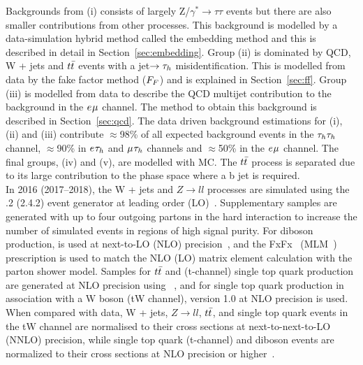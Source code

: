 Backgrounds from (i) consists of largely Z/$\gamma^* \rightarrow \tau\tau$ events but there are also smaller contributions from other processes. 
This background is modelled by a data-simulation hybrid method called the embedding method and this is described in detail in Section~\ref{sec:embedding}.
Group (ii) is dominated by QCD, W + jets and $t\bar{t}$ events with a jet$\rightarrow \tau_{h}$ misidentification.
This is modelled from data by the fake factor method ($F_{F}$) and is explained in Section~\ref{sec:ff}.
Group (iii) is modelled from data to describe the QCD multijet contribution to the background in the $e_{}\mu_{}$ channel.
The method to obtain this background is described in Section~\ref{sec:qcd}.
The data driven background estimations for (i), (ii) and (iii) contribute $\approx$98\% of all expected background events in the $\tau_{h}\tau_{h}$ channel, $\approx$90\% in $e_{}\tau_{h}$ and $\mu_{}\tau_{h}$ channels and $\approx$50\% in the $e_{}\mu_{}$ channel.
The final groups, (iv) and (v), are modelled with MC.
The $t\bar{t}$ process is separated due to its large contribution to the phase space where a b jet is required. \\

In 2016 (2017--2018), the W + jets and $Z\rightarrow ll$ processes are simulated using the .2 (2.4.2) event generator at leading order (LO)~\cite{Alwall:2011uj}. 
Supplementary samples are generated with up to four outgoing partons in the hard interaction to increase the number of simulated events in regions of high signal purity. 
For diboson production, \MGvATNLO is used at next-to-LO (NLO) precision~\cite{Alwall:2011uj}, and the FxFx~\cite{Frederix:2012ps} (MLM~\cite{Alwall:2007fs}) prescription is used to match the NLO (LO) matrix element calculation with the parton shower model. 
Samples for $t\bar{t}$\cite{Alioli:2011as} and (t-channel) single top quark production\cite{Frederix:2012dh} are generated at NLO precision using ~\cite{Nason:2004rx,Frixione:2007vw,Alioli:2010xd,Jezo:2015aia}, and for single top quark production in association with a W boson (tW channel)\cite{Re:2010bp}, \POWHEG version 1.0 at NLO precision is used. 
When compared with data, W + jets, $Z\rightarrow ll$, $t\bar{t}$, and single top quark events in the tW channel are normalised to their cross sections at next-to-next-to-LO (NNLO) precision\cite{Melnikov:2006kv,Czakon:2011xx,Kidonakis:2013zqa}, while single top quark (t-channel) and diboson events are normalized to their cross sections at NLO precision or higher~\cite{Kidonakis:2013zqa,Campbell:2011bn,Gehrmann:2014fva}.


